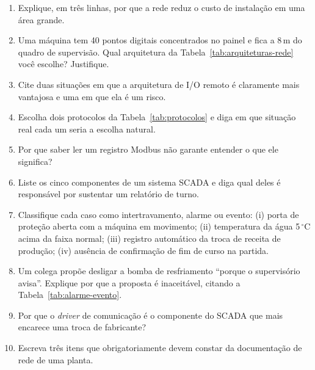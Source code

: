 \begin{exercicios}
\begin{enumerate}[label=\alph*)]
  \item Explique, em três linhas, por que a rede reduz o custo de instalação em uma área grande.
  \item Uma máquina tem 40 pontos digitais concentrados no painel e fica a 8\,m do quadro de
        supervisão. Qual arquitetura da Tabela~\ref{tab:arquiteturas-rede} você escolhe? Justifique.
  \item Cite duas situações em que a arquitetura de I/O remoto é claramente mais vantajosa e uma em
        que ela é um risco.
  \item Escolha dois protocolos da Tabela~\ref{tab:protocolos} e diga em que situação real cada um
        seria a escolha natural.
  \item Por que saber ler um registro Modbus não garante entender o que ele significa?
  \item Liste os cinco componentes de um sistema SCADA e diga qual deles é responsável por sustentar
        um relatório de turno.
  \item Classifique cada caso como intertravamento, alarme ou evento:
        (i) porta de proteção aberta com a máquina em movimento;
        (ii) temperatura da água 5\,$^\circ$C acima da faixa normal;
        (iii) registro automático da troca de receita de produção;
        (iv) ausência de confirmação de fim de curso na partida.
  \item Um colega propõe desligar a bomba de resfriamento ``porque o supervisório avisa''. Explique
        por que a proposta é inaceitável, citando a Tabela~\ref{tab:alarme-evento}.
  \item Por que o \emph{driver} de comunicação é o componente do SCADA que mais encarece uma troca de
        fabricante?
  \item Escreva três itens que obrigatoriamente devem constar da documentação de rede de uma planta.
\end{enumerate}
\end{exercicios}
